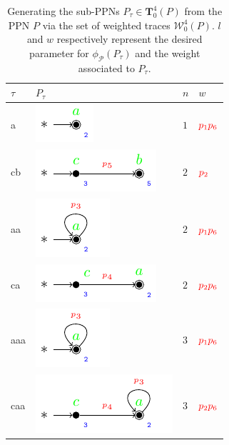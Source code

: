 \begin{table}[!t]
	\caption{Generating the sub-PPNs $P_\tau\in \mathbf{T}_0^4(P)$ from the PPN $P$ via the set of weighted traces $\mathcal{W}_0^4(P)$. $l$ and $w$ respectively represent the desired parameter for $\phi_{\mathcal{P}}(P_\tau)$ and the weight associated to $P_\tau$.}\label{tab:proj}
	\centering
	\begin{tabular}{>{\centering\arraybackslash} m{1cm}| >{\centering\arraybackslash} m{4cm} >{\centering\arraybackslash} m{1cm} >{\centering\arraybackslash} m{1cm} }
		\toprule
		$\tau$&$P_\tau$&$n$&$w$\\
		\midrule
		a & \includegraphics{images/trace_a} & $1$ & $\color{red}p_1p_6$\\   
		cb & \includegraphics{images/trace_cb} & $2$ & $\color{red}p_2$\\
		aa & \includegraphics{images/trace_a_loop} & $2$ & $\color{red}p_1p_6$\\ 
		ca & \includegraphics{images/trace_ca} & $2$ & $\color{red}p_2p_6$\\ 
		aaa & \includegraphics{images/trace_a_loop} & $3$ & $\color{red}p_1p_6$\\ 
		caa & \includegraphics{images/trace_ca_loop} & $3$ & $\color{red}p_2p_6$\\  

\end{tabular}
\end{table}
